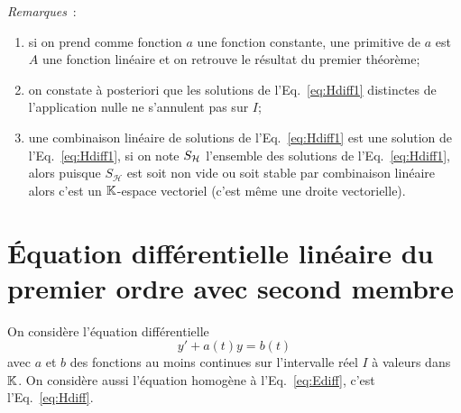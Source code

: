 \emph{Remarques}~:
\begin{enumerate}
\item si on prend comme fonction $a$ une fonction constante, une primitive de $a$ est $A$ une fonction linéaire et on retrouve le résultat du premier théorème;
\item on constate à posteriori que les solutions de l'Eq.~\eqref{eq:Hdiff1} distinctes de l'application nulle ne s'annulent pas sur $I$;
\item une combinaison linéaire de solutions de l'Eq.~\eqref{eq:Hdiff1} est une solution de l'Eq.~\eqref{eq:Hdiff1}, si on note $S_{\mathcal{H}} $ l'ensemble des solutions de l'Eq.~\eqref{eq:Hdiff1}, alors puisque $S_\mathcal{H} $ est soit non vide ou soit stable par combinaison linéaire alors c'est un $\mathbb{K}$-espace vectoriel (c'est même une droite vectorielle).
\end{enumerate}

\section{Équation différentielle linéaire du premier ordre avec second membre}
\label{sec:equadifflinpremierordresecondmembre}
On considère l'équation différentielle
\begin{equation}
y'+a(t)y=b(t) \label{eq:Ediff}
\end{equation}
avec $a$ et $b$ des fonctions au moins continues sur l'intervalle réel $I$ à valeurs dans $\mathbb{K}$.
On considère aussi l'équation homogène à l'Eq.~\eqref{eq:Ediff}, c'est l'Eq.~\eqref{eq:Hdiff}.

